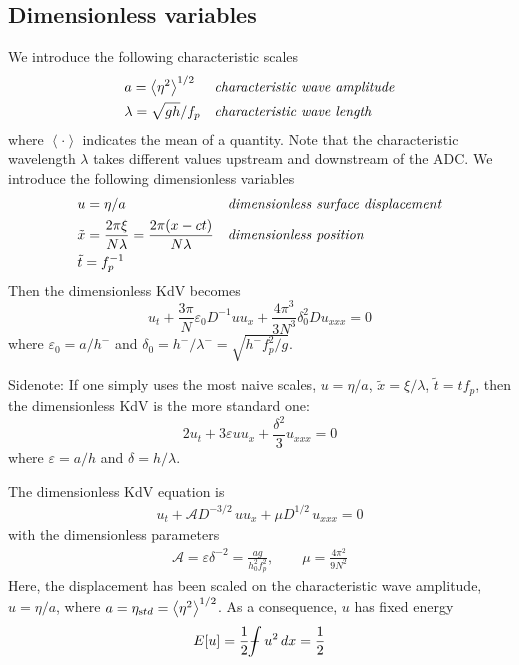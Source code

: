 \documentclass[11pt]{article}
\newcommand{\vsp}[1]{\vspace{#1 pc} \noindent}
\newcommand{\mean}[1]{\left< #1 \right>}
\newcommand{\eps}{\varepsilon}
\newcommand{\depth}{h}
\newcommand{\dup}{\depth^{-}}
\newcommand{\freqp}{f_p}
\newcommand{\lam}{\lambda}
\newcommand{\lamup}{\lam^{-}}
\newcommand{\lamfac}{N}
\newcommand{\etastd}{\eta_{\text std}}
\newcommand{\amp}{a}
\newcommand{\epsup}{\eps_0}
\newcommand{\delup}{\delta_0}
\newcommand{\drat}{D}
\newcommand{\ampp}{\mathcal{A}}
\def\Xint#1{\mathchoice
   {\XXint\displaystyle\textstyle{#1}}%
   {\XXint\textstyle\scriptstyle{#1}}%
   {\XXint\scriptstyle\scriptscriptstyle{#1}}%
   {\XXint\scriptscriptstyle\scriptscriptstyle{#1}}%
   \!\int}
\def\XXint#1#2#3{{\setbox0=\hbox{$#1{#2#3}{\int}$}
     \vcenter{\hbox{$#2#3$}}\kern-.5\wd0}}
\def\dashint{\Xint-}
\newcommand{\intt}{\dashint}%
\newcommand{\dx}{\, dx}
\begin{document}
\subsection{Dimensionless variables}

We introduce the following characteristic scales
\begin{align}
&\amp = \mean{\eta^2}^{1/2} 
&&\mbox{\em characteristic wave amplitude} \\
&\lam = \sqrt{g \depth} / \freqp
&&\mbox{\em characteristic wave length}
\end{align}
where $\mean{\cdot}$ indicates the mean of a quantity. Note that the characteristic wavelength $\lam$ takes different values upstream and downstream of the ADC.
We introduce the following dimensionless variables
\begin{align}
&u = \eta/\amp
&&\mbox{\em dimensionless surface displacement} \\
&\tilde{x} = \frac{2 \pi \xi}{\lamfac \lam} = \frac{2 \pi (x-ct)}{\lamfac \lam}
&&\mbox{\em dimensionless position} \\
& \tilde{t} = \freqp^{-1}
\end{align}
Then the dimensionless KdV becomes
\begin{equation}
u_t + \frac{3 \pi}{\lamfac} \epsup \drat^{-1} u u_x + \frac{4 \pi^3}{3 \lamfac^3} \delup^2 \drat u_{xxx} = 0
\end{equation}
where $\epsup = \amp/\dup$ and $\delup = \dup/\lamup = \sqrt{\dup \freqp^2/g}$.

Sidenote: If one simply uses the most naive scales, $u = \eta/\amp$, $\tilde{x} = \xi/\lam$, $\tilde{t} = t \freqp$, then the dimensionless KdV is the more standard one:
\begin{equation}
2 u_t + 3 \eps u u_x + \frac{\delta^2}{3} u_{xxx} = 0
\end{equation}
where $\eps = a/h$ and $\delta = h/\lam$.


\vsp{10}
The dimensionless KdV equation is
\begin{align}
\label{varKdV}
u_t + \ampp D^{-3/2} \, u u_x + \mu D^{1/2} \, u_{xxx} = 0
\end{align}
with the dimensionless parameters
\begin{align}
\label{ndKdV}
\ampp = \eps \delta^{-2} = \frac{ag}{h_0^2 f_p^2} , \qquad
\mu = \frac{4 \pi^2}{9 \lamfac^2}
\end{align}
Here, the displacement has been scaled on the characteristic wave amplitude, $u = \eta/a$, where $a = \etastd= \mean{\eta^2}^{1/2}$.
As a consequence, $u$ has fixed energy
\begin{equation}
E[u] = \frac{1}{2} \intt u^2 \dx = \frac{1}{2}
\end{equation}
\end{document}
